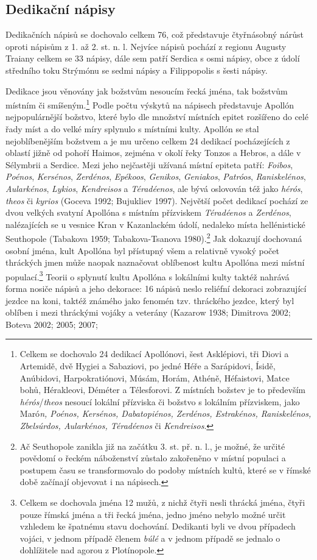 
\subsection[dedikační-nápisy-14]{Dedikační nápisy}

Dedikačních nápisů se dochovalo celkem 76, což představuje čtyřnásobný nárůst oproti nápisům z 1. až 2. st. n. l. Nejvíce nápisů pochází z regionu Augusty Traiany celkem se 33 nápisy, dále sem patří Serdica s osmi nápisy, obce z údolí středního toku Strýmónu se sedmi nápisy a Filippopolis s šesti nápisy.

Dedikace jsou věnovány jak božstvům nesoucím řecká jména, tak božstvům místním či smíšeným.\footnote{Celkem se dochovalo 24 dedikací Apollónovi, šest Asklépiovi, tři Diovi a Artemidě, dvě Hygiei a Sabaziovi, po jedné Héře a Sarápidovi, Ísidě, Anúbidovi, Harpokratiónovi, Músám, Horám, Athéně, Héfaistovi, Matce bohů, Hérakleovi, Déméter a Télesforovi. Z místních božstev je to především {\em hérós}/{\em theos} nesoucí lokální přízviska či božstvo s lokálním přízviskem, jako Maró{\em n, Poénos, Kersénos, Dabatopiénos, Zerdénos, Estrakénos, Raniskelénos, Zbelsúrdos, Aularkénos, Téradéenos} či {\em Kendreisos}.} Podle počtu výskytů na nápisech představuje Apollón nejpopulárnější božstvo, které bylo dle množství místních epitet rozšířeno do celé řady míst a do velké míry splynulo s místními kulty. Apollón se stal nejoblíbenějším božstvem a je mu určeno celkem 24 dedikací pocházejících z oblastí jižně od pohoří Haimos, zejména v okolí řeky Tonzos a Hebros, a dále v Sélymbrii a Serdice. Mezi jeho nejčastěji užívaná místní epiteta patří: {\em Foibos}, {\em Poénos}, {\em Kersénos}, {\em Zerdénos}, {\em Epékoos}, {\em Genikos}, {\em Geniakos}, {\em Patróos}, {\em Raniskelénos}, {\em Aularkénos}, {\em Lykios}, {\em Kendreisos} a {\em Téradéenos}, ale bývá oslovován též jako {\em hérós}, {\em theos} či {\em kyrios} (Goceva 1992; Bujukliev 1997). Největší počet dedikací pochází ze dvou velkých svatyní Apollóna s místním přízviskem {\em Téradéenos} a {\em Zerdénos}, nalézajících se u vesnice Kran v Kazanlackém údolí, nedaleko místa hellénistické Seuthopole (Tabakova 1959; Tabakova-Tsanova 1980).\footnote{Ač Seuthopole zanikla již na začátku 3. st. př. n. l., je možné, že určité povědomí o řeckém náboženství zůstalo zakořeněno v místní populaci a postupem času se transformovalo do podoby místních kultů, které se v římské době začínají objevovat i na nápisech.} Jak dokazují dochovaná osobní jména, kult Apollóna byl přístupný všem a relativně vysoký počet thráckých jmen může naopak naznačovat oblíbenost kultu Apollóna mezi místní populací.\footnote{Celkem se dochovala jména 12 mužů, z nichž čtyři nesli thrácká jména, čtyři pouze římská jména a tři řecká jména, jedno jméno nebylo možné určit vzhledem ke špatnému stavu dochování. Dedikanti byli ve dvou případech vojáci, v jednom případě členem {\em búlé} a v jednom případě se jednalo o dohlížitele nad agorou z Plotínopole.} Teorii o splynutí kultu Apollóna s lokálními kulty taktéž nahrává forma nosiče nápisů a jeho dekorace: 16 nápisů neslo reliéfní dekoraci zobrazující jezdce na koni, taktéž známého jako fenomén tzv. thráckého jezdce, který byl oblíben i mezi thráckými vojáky a veterány (Kazarow 1938; Dimitrova 2002; Boteva 2002; 2005; 2007; 
